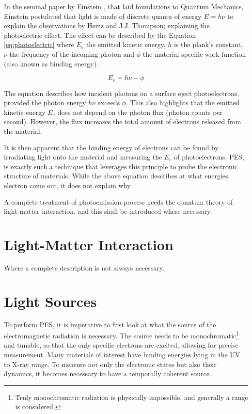 In the seminal paper by Einstein \cite{einsteinUberErzeugungUnd1905}, that laid foundations to Quantum Mechanics, Einstein postulated that light is made of discrete quanta of energy $E = h\nu$ to explain the observations by Hertz and J.J. Thompson; explaining the photoelectric effect. The effect can be described by the Equation \ref{eq:photoelectric} where $E_e$ the emitted kinetic energy, $h$ is the plank's constant, $\nu$ the frequency of the incoming photon and  $\phi$ the material-specific work function (also known as binding energy). 

\begin{equation}\label{eq:photoelectric}
    E_e = h\nu - \phi
\end{equation}

The equation describes how incident photons on a surface eject photoelectrons, provided the photon energy $h\nu$ exceeds $\phi$. This also highlights that the emitted kinetic energy $E_e$ does not depend on the photon flux (photon counts per second). However, the flux increases the total amount of electrons released from the material.

It is then apparent that the binding energy of electrons can be found by irradiating light onto the material and measuring the $E_e$ of photoelectrons. \gls{PES}, is exactly such a technique that leverages this principle to probe the electronic structure of materials. While the above equation describes at what energies electron come out, it does not explain why 



A complete treatment of photoemission process needs the quantum theory of light-matter interaction, and this shall be introduced where necessary. 

\section{Light-Matter Interaction}\label{subsection:light-matter-interaction}
Where a complete description is not always necessary.

\section{Light Sources}\label{subsection:light-sources}
To perform \gls{PES}, it is imperative to first look at what the source of the electromagnetic radiation is necessary. The source needs to be monochromatic\footnote{Truly monochromatic radiation is physically impossible, and generally a range is considered.} and tunable, so that the only specific electrons are excited, allowing for precise measurement. Many materials of interest have binding energies lying in the UV to X-ray range. To measure not only the electronic states but also their dynamics, it becomes necessary to have a temporally coherent source.


